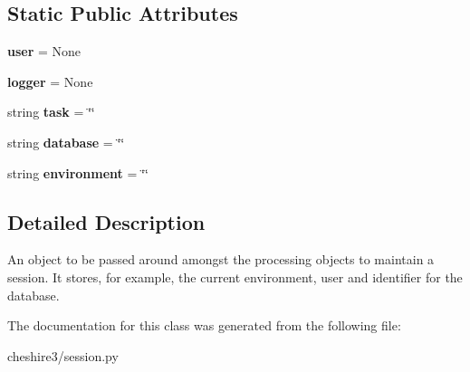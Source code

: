 \subsection*{Static Public Attributes}
\begin{DoxyCompactItemize}
\item 
\hypertarget{classcheshire3_1_1session_1_1_session_ac76940a957a68dff569d06431636b783}{{\bfseries user} = None}\label{classcheshire3_1_1session_1_1_session_ac76940a957a68dff569d06431636b783}

\item 
\hypertarget{classcheshire3_1_1session_1_1_session_a423a87d30caa107f23a7f91c9d29c538}{{\bfseries logger} = None}\label{classcheshire3_1_1session_1_1_session_a423a87d30caa107f23a7f91c9d29c538}

\item 
\hypertarget{classcheshire3_1_1session_1_1_session_ac4b09198e29a4a414cfb4f26b564829a}{string {\bfseries task} = \char`\"{}\char`\"{}}\label{classcheshire3_1_1session_1_1_session_ac4b09198e29a4a414cfb4f26b564829a}

\item 
\hypertarget{classcheshire3_1_1session_1_1_session_ab0f1174da9d46cdcd8a64c3d3f7b9a7a}{string {\bfseries database} = \char`\"{}\char`\"{}}\label{classcheshire3_1_1session_1_1_session_ab0f1174da9d46cdcd8a64c3d3f7b9a7a}

\item 
\hypertarget{classcheshire3_1_1session_1_1_session_a12d9cdde520b135947816f37091bdc3c}{string {\bfseries environment} = \char`\"{}\char`\"{}}\label{classcheshire3_1_1session_1_1_session_a12d9cdde520b135947816f37091bdc3c}

\end{DoxyCompactItemize}


\subsection{Detailed Description}
\begin{DoxyVerb}An object to be passed around amongst the processing objects to
maintain a session.  It stores, for example, the current
environment, user and identifier for the database.\end{DoxyVerb}
 

The documentation for this class was generated from the following file\-:\begin{DoxyCompactItemize}
\item 
cheshire3/session.\-py\end{DoxyCompactItemize}
